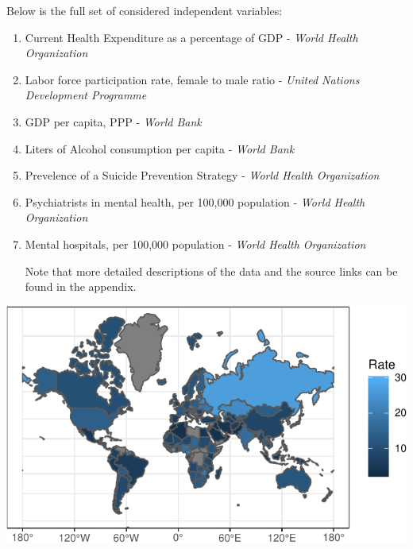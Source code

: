 \documentclass[]{article}
\begin{document}
Below is the full set of considered independent variables:
\begin{enumerate}
\def\labelenumi{\arabic{enumi}.}
\item
  Current Health Expenditure as a percentage of GDP - 
  \emph{World Health Organization}

\item
  Labor force participation rate, female to male ratio - 
  \emph{United Nations Development Programme }
  
\item
  GDP per capita, PPP - 
  \emph{World Bank} 

\item
  Liters of Alcohol consumption per capita - 
  \emph{World Bank}
  
\item
  Prevelence of a Suicide Prevention Strategy - 
  \emph{World Health Organization}
  
\item  
  Psychiatrists in mental health, per 100,000 population - 
  \emph{World Health Organization}
  
\item
  Mental hospitals, per 100,000 population - 
  \emph{World Health Organization}
    
Note that more detailed descriptions of the data and the source links can be found in the appendix. 


 
\end{enumerate}

\begin{center}\includegraphics{Project_Report_files/figure-latex/world_map_plot-1} \end{center}
\end{document}
